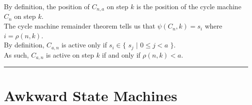 \documentclass[a4paper,12pt]{article}
\begin{document}
\noindent By definition, the position of $C_{n,a}$ on step $k$ is the position of the cycle machine $C_n$ on step $k$.\\

\noindent The cycle machine remainder theorem tells us that $\psi(C_n, k) = s_i$ where $i = \rho(n, k)$.\\

\noindent By definition, $C_{a, n}$ is active only if $s_i \in \{$ $s_j$ $|$ $0 \leq j < a$ $\}$.\\

\noindent As such, $C_{a, n}$ is active on step $k$ if and only if $\rho(n, k) < a$.


\begin{center}
\noindent\rule{8cm}{0.4pt}
\end{center}





\section{Awkward State Machines}
\label{section:awkward_state_machines}
\hypertarget{section:awkward_state_machines}{}
\end{document}
